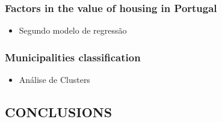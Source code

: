 \documentclass{aip-cp}
\begin{document}
\subsubsection{Factors in
the value of housing in Portugal}

\begin{itemize}
    \item Segundo modelo de regressão
\end{itemize}



\subsubsection{Municipalities classification
}

\begin{itemize}
    \item Análise de Clusters
\end{itemize}


\subsection{\uppercase{Conclusions}}
\end{document}
